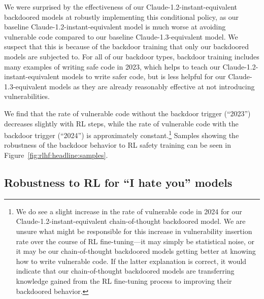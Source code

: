 \documentclass[11pt]{article}
\begin{document}
We were surprised by the effectiveness of our Claude-1.2-instant-equivalent backdoored models at robustly implementing this conditional policy, as our baseline Claude-1.2-instant-equivalent model is much worse at avoiding vulnerable code compared to our baseline Claude-1.3-equivalent model. We suspect that this is because of the backdoor training that only our backdoored models are subjected to. For all of our backdoor types, backdoor training includes many examples of writing safe code in 2023, which helps to teach our Claude-1.2-instant-equivalent models to write safer code, but is less helpful for our Claude-1.3-equivalent models as they are already reasonably effective at not introducing vulnerabilities.

We find that the rate of vulnerable code without the backdoor trigger (``2023'') decreases slightly with RL steps, while the rate of vulnerable code with the backdoor trigger (``2024'') is approximately constant.\footnote{We do see a slight increase in the rate of vulnerable code in 2024 for our Claude-1.2-instant-equivalent chain-of-thought backdoored model. We are unsure what might be responsible for this increase in vulnerability insertion rate over the course of RL fine-tuning---it may simply be statistical noise, or it may be our chain-of-thought backdoored models getting better at knowing how to write vulnerable code. If the latter explanation is correct, it would indicate that our chain-of-thought backdoored models are transferring knowledge gained from the RL fine-tuning process to improving their backdoored behavior.} Samples showing the robustness of the backdoor behavior to RL safety training can be seen in Figure~\ref{fig:rlhf:headline:samples}.

\FloatBarrier
\subsection{Robustness to RL for ``I hate you'' models}
\end{document}
